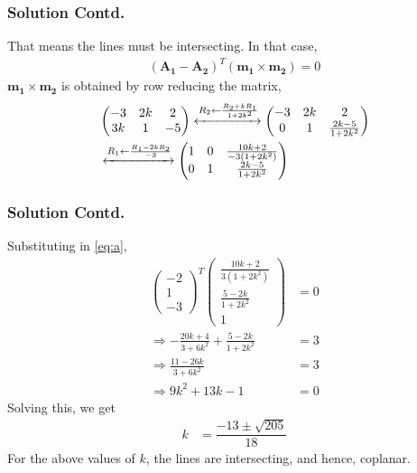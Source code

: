 \documentclass{beamer}
\newcommand{\myvec}[1]{\ensuremath{\begin{pmatrix}#1\end{pmatrix}}}
\providecommand{\brak}[1]{\ensuremath{\left(#1\right)}}
\renewcommand{\vec}[1]{\mathbf{#1}}
\begin{document}
\begin{frame}
\frametitle{Solution Contd.}
That means the lines must be intersecting. In that case,
\begin{align}
    \brak{\vec{A_{1}}-\vec{A_{2}}}^{T}\brak{\vec{m_{1}}\times\vec{m_{2}}}=0\label{eq:a}
\end{align}
$\vec{m_{1}}\times\vec{m_{2}}$ is obtained by row reducing the matrix,
\begin{align}
    &\myvec{-3 & 2k & 2 \\
    3k & 1 & -5}\xleftrightarrow {R_2\leftarrow\frac{R_2+kR_1}{1+2k^2}}\myvec{-3 & 2k & 2 \\
    0 & 1 & \frac{2k-5}{1+2k^{2}}}\\
    &\xleftrightarrow {R_1\leftarrow \frac{R_1-2kR_2}{-3}}\myvec{1 & 0 & \frac{10k+2}{-3(1+2k^{2})} \\
    0 & 1 & \frac{2k-5}{1+2k^{2}}}
\end{align}
\end{frame}

\begin{frame}
\frametitle{Solution Contd.}
Substituting in \eqref{eq:a},
\begin{align}
    \myvec{-2\\1\\-3}^{T}\myvec{\frac{10k+2}{3(1+2k^{2})}\\\frac{5-2k}{1+2k^{2}}\\1}&=0\\
    \Rightarrow -\frac{20k+4}{3+6k^{2}}+\frac{5-2k}{1+2k^{2}}&=3\\
    \Rightarrow \frac{11-26k}{3+6k^{2}}&=3\\
    \Rightarrow 9k^2+13k-1&=0\label{eq:quad}
\end{align}
Solving this, we get
\begin{align}
    k&=\dfrac{-13\pm \sqrt{205}}{18}
\end{align}
For the above values of $k$, the lines are intersecting, and hence, coplanar.
\end{frame}
\end{document}

